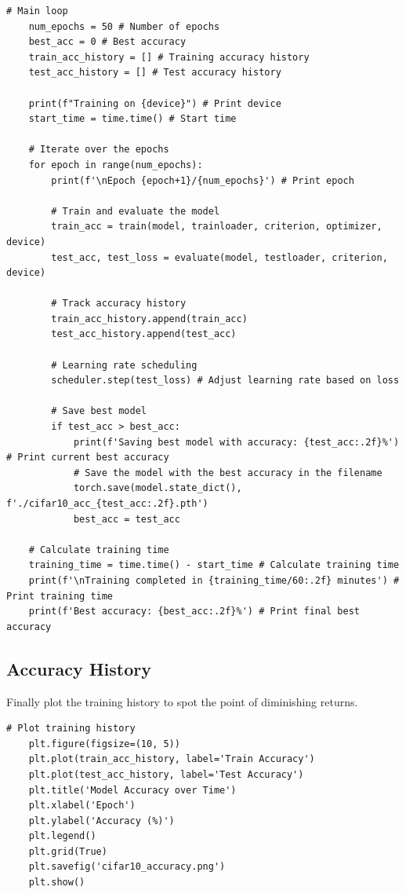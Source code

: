 \begin{lstlisting}[caption={Training Loop}, label={lst:training_loop}]
    # Main loop
    num_epochs = 50 # Number of epochs
    best_acc = 0 # Best accuracy
    train_acc_history = [] # Training accuracy history
    test_acc_history = [] # Test accuracy history

    print(f"Training on {device}") # Print device
    start_time = time.time() # Start time

    # Iterate over the epochs
    for epoch in range(num_epochs):
        print(f'\nEpoch {epoch+1}/{num_epochs}') # Print epoch
        
        # Train and evaluate the model
        train_acc = train(model, trainloader, criterion, optimizer, device)
        test_acc, test_loss = evaluate(model, testloader, criterion, device)
        
        # Track accuracy history
        train_acc_history.append(train_acc)
        test_acc_history.append(test_acc)
        
        # Learning rate scheduling
        scheduler.step(test_loss) # Adjust learning rate based on loss
        
        # Save best model
        if test_acc > best_acc:
            print(f'Saving best model with accuracy: {test_acc:.2f}%') # Print current best accuracy
            # Save the model with the best accuracy in the filename
            torch.save(model.state_dict(), f'./cifar10_acc_{test_acc:.2f}.pth')
            best_acc = test_acc

    # Calculate training time
    training_time = time.time() - start_time # Calculate training time
    print(f'\nTraining completed in {training_time/60:.2f} minutes') # Print training time
    print(f'Best accuracy: {best_acc:.2f}%') # Print final best accuracy
\end{lstlisting}

\subsection{Accuracy History}
Finally plot the training history to spot the point of diminishing returns.

\begin{lstlisting}[caption={Accuracy History}, label={lst:history}]
    # Plot training history
    plt.figure(figsize=(10, 5))
    plt.plot(train_acc_history, label='Train Accuracy')
    plt.plot(test_acc_history, label='Test Accuracy')
    plt.title('Model Accuracy over Time')
    plt.xlabel('Epoch')
    plt.ylabel('Accuracy (%)')
    plt.legend()
    plt.grid(True)
    plt.savefig('cifar10_accuracy.png')
    plt.show()
\end{lstlisting}

